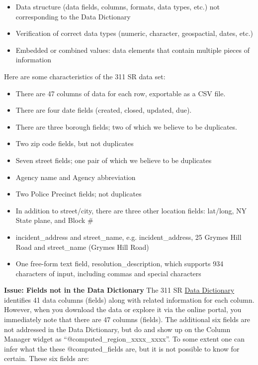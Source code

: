 \documentclass[12pt, titlepage]{article}
\begin{document}
\begin{itemize}
	\item Data structure (data fields, columns, formats, data types, etc.) 
	not corresponding to the Data Dictionary
	\item Verification of correct data types (numeric, character, geospactial, dates, etc.)
	\item Embedded or combined values: data elements that 
	contain multiple pieces of information 
\end{itemize}

Here are some characteristics of the 311 SR data set:

\begin{itemize}
	\item There are 47 columns of data for each row, exportable as a CSV file.
	\item There are four date fields (created, closed, updated, due).
	\item There are three borough fields; two of which we believe to be duplicates.
	\item Two zip code fields, but not duplicates
	\item Seven street fields; one pair of which we believe to be duplicates
	\item Agency name and Agency abbreviation
	\item Two Police Precinct fields; not duplicates
	\item In addition to street/city, there are three other location fields: 
	lat/long, NY State plane, and Block \#
	\item incident\_address and street\_name, e.g. incident\_address, 
	25 Grymes Hill Road and street\_name (Grymes Hill Road)
	\item One free-form text field, resolution\_description, which 
	supports 934 characters of input, including commas and special characters
\end{itemize}

\textbf{Issue: Fields not in the Data Dictionary} The 311 SR 
\href{https://data.cityofnewyork.us/api/views/erm2-nwe9/files/b372b884-f86a-453b-ba16-1fe06ce9d212?download=true&filename=311_ServiceRequest_2010-Present_DataDictionary_Updated_2023.xlsx}{Data Dictionary}
 identifies 41 data columns (fields) along with related information 
 for each column. However, when you download the data or 
 explore it via the online portal, you immediately note that there 
 are 47 columns (fields). The additional six fields are not addressed in the 
 Data Dictionary, but do and show up on the Column Manager widget
 as ``@computed\_region\_xxxx\_xxxx''. To some extent one can infer 
 what the these @computed\_fields are, but it is not possible to know 
 for certain. These six fields are:
\end{document}
